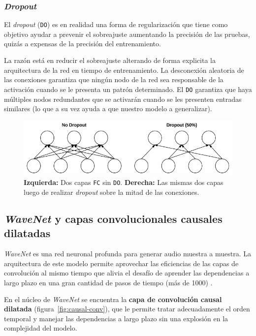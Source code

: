 \documentclass[a4paper,12pt]{article}
\begin{document}
\subsubsection{\textit{Dropout}}
El \textit{dropout} (\texttt{DO}) es en realidad una forma de regularización que tiene como objetivo ayudar a prevenir el sobreajuste aumentando la precisión de las pruebas, quizás a expensas de la precisión del entrenamiento. \citep{rosebrock2017deep}

La razón está en reducir el sobreajuste alterando de forma explicita la arquitectura de la red en tiempo de entrenamiento. La desconexión aleatoria de las conexiones garantiza que ningún nodo de la red sea responsable de la activación cuando se le presenta un patrón determinado. El \texttt{DO} garantiza que haya múltiples nodos redundantes que se activarán cuando se les presenten entradas similares (lo que a su vez ayuda a que nuestro modelo a generalizar).

\begin{figure}[H]
	\begin{center}				
	\includegraphics[width=1\textwidth]{tesis_46.png}
  	\caption{\textbf{Izquierda:} Dos capas \texttt{FC} sin \texttt{DO}. \textbf{Derecha:} Las mismas dos capas luego de realizar \textit{dropout} sobre la mitad de las conexiones.}
  	\label{fig:type-pooling}
  	\end{center}
\end{figure}

\subsection{\textit{WaveNet} y capas convolucionales causales dilatadas}

\textit{WaveNet} es una red neuronal profunda para generar audio muestra a muestra. La arquitectura de este modelo permite aprovechar las eficiencias de las capas de convolución al mismo tiempo que alivia el desafío de aprender las dependencias a largo plazo en una gran cantidad de pasos de tiempo (más de 1000) \citep{wavenet2}.

En el núcleo de \textit{WaveNet} se encuentra la \textbf{capa de convolución causal dilatada} (figura~\ref{fig:causal-conv}), que le permite tratar adecuadamente el orden temporal y manejar las dependencias a largo plazo sin una explosión en la complejidad del modelo. \citep{wavenet}
\end{document}
